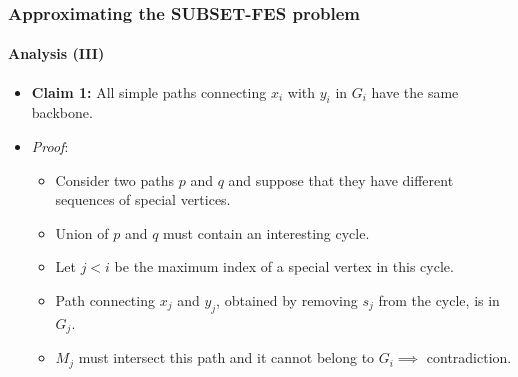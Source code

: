 \documentclass[10pt]{beamer}
\begin{document}
\begin{frame}
    \frametitle{Approximating the SUBSET-FES problem}
    \framesubtitle{Analysis (III)}
    \begin{itemize}
        \item \textbf{Claim 1:} All simple paths connecting \(x_i\) with \(y_i\) in \(G_i\) have the same backbone.
        \item \textit{Proof}:
        \begin{itemize}
            \item Consider two paths \(p\) and \(q\) and suppose that they have different sequences of special vertices. \item Union of \(p\) and \(q\) must contain an interesting cycle.
            \item Let \(j < i\) be the maximum index of a special vertex in this cycle.
            \item Path connecting \(x_j\) and \(y_j\), obtained by removing \(s_j\) from the cycle, is in \(G_j\).
            \item \(M_j\) must intersect this path and it cannot belong to \(G_i \implies\) contradiction.
        \end{itemize}
    \end{itemize}
\end{frame}
\end{document}
